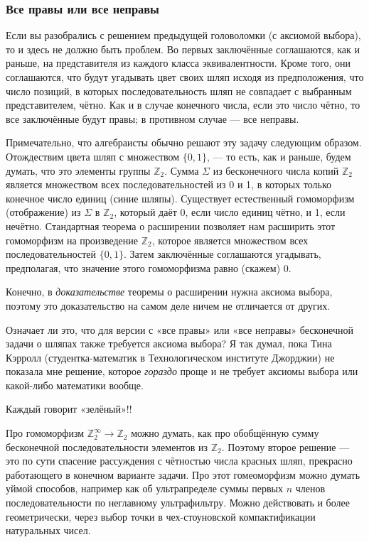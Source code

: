 \subsubsection*{Все правы или все неправы}

Если вы разобрались с решением предыдущей головоломки (с аксиомой выбора), то и здесь не должно быть проблем.
Во первых заключённые соглашаются, как и раньше, на представителя из каждого класса эквивалентности.
Кроме того, они соглашаются, что будут угадывать цвет своих шляп исходя из предположения, что число позиций, в которых последовательность шляп не совпадает с выбранным представителем, чётно.
Как и в случае конечного числа, если это число чётно, то все заключённые будут правы; в противном случае --- все неправы.

Примечательно, что алгебраисты обычно решают эту задачу следующим образом.
Отождествим цвета шляп с множеством $\{0, 1\}$, --- то есть, как и раньше, 
будем думать, что это элементы группы $\mathbb{Z}_2$.
Сумма $\Sigma$ из бесконечного числа копий $\mathbb{Z}_2$ является множеством всех последовательностей из 0 и 1, в которых только конечное число единиц (синие шляпы).
Существует естественный гомоморфизм (отображение) из $\Sigma$ в $\mathbb{Z}_2$, который даёт 0, если число единиц чётно, и 1, если нечётно.
Стандартная теорема о расширении позволяет нам расширить этот гомоморфизм на произведение $\mathbb{Z}_2$, которое является множеством всех последовательностей $\{0, 1\}$.
Затем заключённые соглашаются угадывать, предполагая, что значение этого гомоморфизма равно (скажем) 0.

Конечно, в \emph{доказательстве} теоремы о расширении нужна аксиома выбора, поэтому это доказательство на самом деле ничем не отличается от других.

Означает ли это, что для версии с «все правы» или «все неправы» бесконечной задачи о шляпах также требуется аксиома выбора?
Я так думал, пока Тина Кэрролл (студентка-математик в Технологическом институте Джорджии) не показала мне решение, которое \emph{гораздо} проще и не требует аксиомы выбора или какой-либо математики вообще.

Каждый говорит «зелёный»!!

\begin{addedbytheeditors}
Про гомоморфизм $\mathbb{Z}_2^\infty\to \mathbb{Z}_2$ можно думать, как про обобщённую сумму бесконечной последовательности элементов из $\mathbb{Z}_2$.
Поэтому второе решение --- это по сути спасение рассуждения с чётностью числа красных шляп, прекрасно работающего в конечном варианте задачи.
Про этот гомеоморфизм можно думать уймой способов, например как об ультрапределе суммы первых $n$ членов последовательности по неглавному ультрафильтру.
Можно действовать и более геометрически, через выбор точки в чех-стоуновской компактификации натуральных чисел.\pr
\end{addedbytheeditors}


